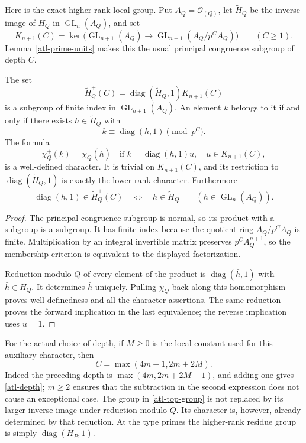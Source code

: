 Here is the exact higher-rank local group.  Put
$A_Q=\mathcal O_{(Q)}$, let $\widetilde H_Q$ be the inverse
image of $H_Q$ in $\operatorname{GL}_n(A_Q)$, and set
\[
 K_{n+1}(C)=\ker\bigl(\operatorname{GL}_{n+1}(A_Q)
                 \longrightarrow\operatorname{GL}_{n+1}(A_Q/p^CA_Q)\bigr)
                    \qquad(C\geq1).
\]
Lemma~\ref{atl-prime-units} makes this the usual principal
congruence subgroup of depth $C$.

\begin{lemma}\label{atl-congruence-group}
The set
\begin{equation}\label{atl-top-group}
 \widetilde H_Q^{+}(C)
       =\operatorname{diag}(\widetilde H_Q,1)K_{n+1}(C)
\end{equation}
is a subgroup of finite index in $\operatorname{GL}_{n+1}(A_Q)$.
An element $k$ belongs to it if and only if there exists
$h\in\widetilde H_Q$ with
\[
                      k\equiv\operatorname{diag}(h,1)\pmod {p^C}.
\]
The formula
\begin{equation}\label{atl-top-character}
 \chi_Q^{+}(k)=\chi_Q(\bar h)
       \quad\text{if }k=\operatorname{diag}(h,1)u,
                         \quad u\in K_{n+1}(C),
\end{equation}
is a well-defined character.  It is trivial on $K_{n+1}(C)$,
and its restriction to $\operatorname{diag}(\widetilde H_Q,1)$
is exactly the lower-rank character.  Furthermore
\[
 \operatorname{diag}(h,1)\in\widetilde H_Q^{+}(C)
                       \quad\Longleftrightarrow\quad
 h\in\widetilde H_Q
 \qquad(h\in\operatorname{GL}_n(A_Q)).
\]
\end{lemma}
\begin{proof}
The principal congruence subgroup is normal, so its product
with a subgroup is a subgroup.  It has finite index because
the quotient ring $A_Q/p^CA_Q$ is finite.  Multiplication
by an integral invertible matrix preserves $p^CA_Q^{n+1}$,
so the membership criterion is equivalent to the displayed
factorization.

Reduction modulo $Q$ of every element of the product is
$\operatorname{diag}(\bar h,1)$ with $\bar h\in H_Q$.
It determines $\bar h$ uniquely.  Pulling $\chi_Q$ back
along this homomorphism proves well-definedness and all
the character assertions.  The same reduction proves the
forward implication in the last equivalence; the reverse
implication uses $u=1$.
\end{proof}

For the actual choice of depth, if $M\geq0$ is the local
constant used for this auxiliary character, then
\begin{equation}\label{atl-depth}
                  C=\max(4m+1,2m+2M).
\end{equation}
Indeed the preceding depth is $\max(4m,2m+2M-1)$, and
adding one gives \eqref{atl-depth}; $m\geq2$ ensures that
the subtraction in the second expression does not cause
an exceptional case.  The group in \eqref{atl-top-group}
is not replaced by its larger inverse image under reduction
modulo $Q$.  Its character is, however, already determined
by that reduction.  At the type primes the higher-rank
residue group is simply $\operatorname{diag}(H_P,1)$.

